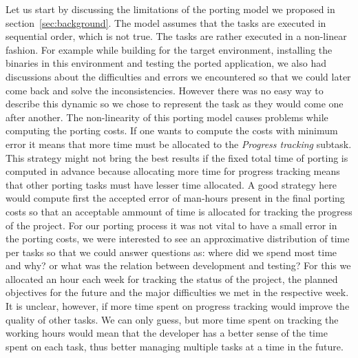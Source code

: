 Let us start by discussing the limitations of the porting model we proposed in
section~\ref{sec:background}. The model assumes that the tasks are executed in
sequential order, which is not true. The tasks are rather executed in a
non-linear fashion. For example while building for the target environment,
installing the binaries in this environment and testing the ported application,
we also had discussions about the difficulties and errors we encountered so that
we could later come back and solve the inconsistencies. However there was no
easy way to describe this dynamic so we chose to represent the task as they
would come one after another. The non-linearity of this porting model causes
problems while computing the porting costs. If one wants to compute the costs
with minimum error it means that more time must be allocated to the
\textit{Progress tracking} subtask. This strategy might not bring the best
results if the fixed total time of porting is computed in advance because
allocating more time for progress tracking means that other porting tasks must
have lesser time allocated. A good strategy here would compute first the
accepted error of man-hours present in the final porting costs so that an
acceptable ammount of time is allocated for tracking the progress of the
project. For our porting process it was not vital to have a small error in the
porting costs, we were interested to see an approximative distribution of time
per tasks so that we could answer questions as: where did we spend most time and
why? or what was the relation between development and testing? For this we
allocated an hour each week for tracking the status of the project, the planned
objectives for the future and the major difficulties we met in the respective
week. It is unclear, however, if more time spent on progress tracking would
improve the quality of other tasks. We can only guess, but more time spent on
tracking the working hours would mean that the developer has a better sense of
the time spent on each task, thus better managing multiple tasks at a time in
the future.

